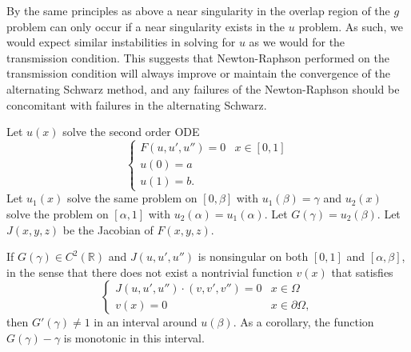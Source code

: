 \documentclass{book}
\begin{document}
By the same principles as above a near singularity in the overlap region of the $g$ problem can only occur if a near singularity exists in the $u$ problem.
As such, we would expect similar instabilities in solving for $u$ as we would for the transmission condition.
This suggests that Newton-Raphson performed on the transmission condition will always improve or maintain the convergence of the alternating Schwarz method, and any failures of the Newton-Raphson should be concomitant with failures in the alternating Schwarz.

\begin{thm}
Let $u(x)$ solve the second order ODE
\begin{equation*}
\begin{cases} F(u,u',u'') = 0 & x \in [0,1] \\ u(0) = a \\
u(1) = b . \end{cases}
\end{equation*}
Let $u_1(x)$ solve the same problem on $[0,\beta]$ with $u_1(\beta) = \gamma$ and $u_2(x)$ solve the problem on $[\alpha,1]$ with $u_2(\alpha) = u_1(\alpha)$.
Let $G(\gamma) = u_2(\beta)$.
Let $J(x,y,z)$ be the Jacobian of $F(x,y,z)$.

If $G(\gamma) \in C^2(\mathbb{R})$ and $J(u,u',u'')$ is nonsingular on both $[0,1]$ and $[\alpha,\beta]$, in the sense that there does not exist a nontrivial function $v(x)$ that satisfies
\begin{equation*}
\begin{cases} J(u,u',u'') \cdot (v, v', v'') = 0 & x \in \Omega \\ v(x) = 0 & x \in \partial \Omega, \end{cases}
\end{equation*}
then $G'(\gamma) \neq 1$ in an interval around $u(\beta)$.
As a corollary, the function $G(\gamma) - \gamma$ is monotonic in this interval.
\end{thm}
\end{document}
